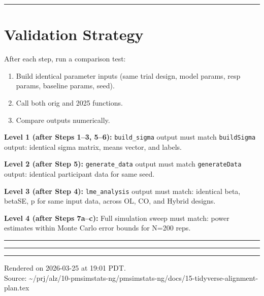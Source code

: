 \documentclass[11pt]{article}
\begin{document}
\bigskip\noindent\rule{\textwidth}{0.4pt}\bigskip

\section{Validation Strategy}

After each step, run a comparison test:

\begin{enumerate}
  \item Build identical parameter inputs (same trial design, model
    params, resp params, baseline params, seed).
  \item Call both orig and 2025 functions.
  \item Compare outputs numerically.
\end{enumerate}

\textbf{Level 1 (after Steps 1--3, 5--6):} \texttt{build\_sigma} output must
match \texttt{buildSigma} output: identical sigma matrix, means vector,
and labels.

\textbf{Level 2 (after Step 5):} \texttt{generate\_data} output must match
\texttt{generateData} output: identical participant data for same seed.

\textbf{Level 3 (after Step 4):} \texttt{lme\_analysis} output must match:
identical beta, betaSE, p for same input data, across OL, CO,
and Hybrid designs.

\textbf{Level 4 (after Steps 7a--c):} Full simulation sweep must match:
power estimates within Monte Carlo error bounds for N=200 reps.

\bigskip\noindent\rule{\textwidth}{0.4pt}\bigskip

\bigskip\noindent\rule{\textwidth}{0.4pt}\bigskip

\vfill
\noindent\rule{\textwidth}{0.4pt}
{\footnotesize
Rendered on 2026-03-25 at 19:01 PDT.\\
Source: \textasciitilde/prj/alz/10-pmsimstats-ng/pmsimstats-ng/docs/15-tidyverse-alignment-plan.tex}
\end{document}
